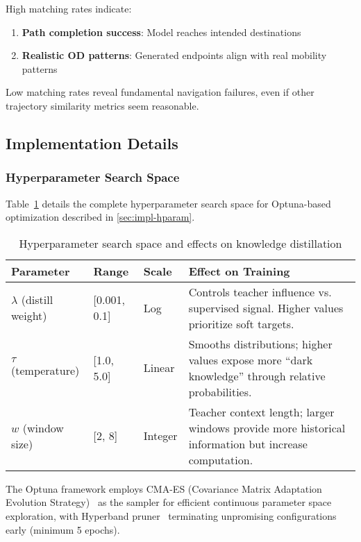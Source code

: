 High matching rates indicate:
\begin{enumerate}[noitemsep,topsep=0pt]
\item \textbf{Path completion success}: Model reaches intended destinations
\item \textbf{Realistic OD patterns}: Generated endpoints align with real mobility patterns
\end{enumerate}

Low matching rates reveal fundamental navigation failures, even if other trajectory similarity metrics seem reasonable.

\subsection{Implementation Details}
\label{app:implementation}

\subsubsection{Hyperparameter Search Space}
\label{app:hyperparam-space}

Table~\ref{tab:hyperparam-search-appendix} details the complete hyperparameter search space for Optuna-based optimization described in \autoref{sec:impl-hparam}.

\begin{table}[H]
\centering
\caption{Hyperparameter search space and effects on knowledge distillation}
\label{tab:hyperparam-search-appendix}
\begin{tabular}{lll p{5.5cm}}
\toprule
\textbf{Parameter} & \textbf{Range} & \textbf{Scale} & \textbf{Effect on Training} \\
\midrule
$\lambda$ (distill weight) & [0.001, 0.1] & Log & Controls teacher influence vs. supervised signal. Higher values prioritize soft targets. \\
\addlinespace
$\tau$ (temperature) & [1.0, 5.0] & Linear & Smooths distributions; higher values expose more ``dark knowledge'' through relative probabilities. \\
\addlinespace
$w$ (window size) & [2, 8] & Integer & Teacher context length; larger windows provide more historical information but increase computation. \\
\bottomrule
\end{tabular}
\end{table}

The Optuna framework employs CMA-ES (Covariance Matrix Adaptation Evolution Strategy)~\cite{hansenCMAEvolutionStrategy2023} as the sampler for efficient continuous parameter space exploration, with Hyperband pruner~\cite{liHyperbandNovelBanditBased2018} terminating unpromising configurations early (minimum 5 epochs).

